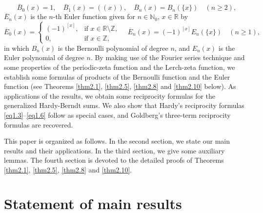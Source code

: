 \documentclass[reqno]{amsart}
\numberwithin{equation}{section}
\begin{document}
\begin{equation}\label{eq1.12}
\overline{B}_{0}(x)=1, \quad\overline{B}_{1}(x)=((x)),\quad\overline{B}_{n}(x)=B_{n}(\{x\})\quad(n\geq2),
\end{equation}
$\overline{E}_{n}(x)$ is the $n$-th Euler function given for $n\in\mathbb{N}_{0}$, $x\in\mathbb{R}$ by
\begin{equation}\label{eq1.13}
\overline{E}_{0}(x)=\begin{cases}
(-1)^{[x]},  &\text{if $x\in\mathbb{R}\setminus\mathbb{Z}$},\\
0,  &\text{if $x\in\mathbb{Z}$},
\end{cases} \quad\overline{E}_{n}(x)=(-1)^{[x]}E_{n}(\{x\})\quad(n\geq1),
\end{equation}
in which $B_{n}(x)$ is the Bernoulli polynomial of degree $n$, and $E_{n}(x)$ is the Euler polynomial of degree $n$. By making use of the Fourier series technique and some properties of the periodic-zeta function and the Lerch-zeta function, we establish some formulas of products of the Bernoulli function and the Euler function (see Theorems \ref{thm2.1}, \ref{thm2.5}, \ref{thm2.8} and \ref{thm2.10} below). As applications of the results, we obtain some reciprocity formulas for the generalized Hardy-Berndt sums. We also show that Hardy's reciprocity formulas \eqref{eq1.3}--\eqref{eq1.6} follow as special cases, and Goldberg's \cite{goldberg} three-term reciprocity formulas are recovered.

This paper is organized as follows. In the second section, we state our main results and their applications. In the third section, we give some auxiliary lemmas. The fourth section is devoted to the detailed proofs of Theorems \ref{thm2.1}, \ref{thm2.5}, \ref{thm2.8} and \ref{thm2.10}.

\section{Statement of main results}
\end{document}
